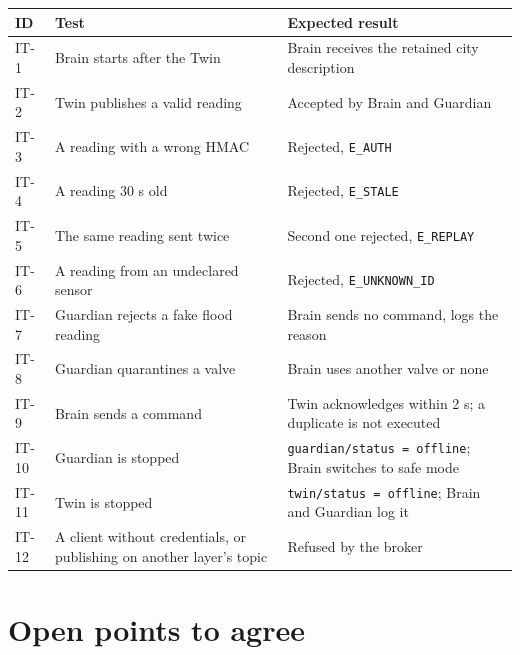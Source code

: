 \documentclass[11pt,a4paper]{article}
\newcommand{\code}[1]{\texttt{#1}}
\begin{document}
\begin{longtable}{@{}l p{8.4cm} p{4.6cm}@{}}
\toprule
\textbf{ID} & \textbf{Test} & \textbf{Expected result} \\
\midrule
\endhead
IT-1 & Brain starts after the Twin & Brain receives the retained city description \\
IT-2 & Twin publishes a valid reading & Accepted by Brain and Guardian \\
IT-3 & A reading with a wrong HMAC & Rejected, \code{E\_AUTH} \\
IT-4 & A reading 30 s old & Rejected, \code{E\_STALE} \\
IT-5 & The same reading sent twice & Second one rejected, \code{E\_REPLAY} \\
IT-6 & A reading from an undeclared sensor & Rejected, \code{E\_UNKNOWN\_ID} \\
IT-7 & Guardian rejects a fake flood reading & Brain sends no command, logs the reason \\
IT-8 & Guardian quarantines a valve & Brain uses another valve or none \\
IT-9 & Brain sends a command & Twin acknowledges within 2 s; a duplicate is not executed \\
IT-10 & Guardian is stopped & \code{guardian/\allowbreak status = offline}; Brain switches to safe mode \\
IT-11 & Twin is stopped & \code{twin/\allowbreak status = offline}; Brain and Guardian log it \\
IT-12 & A client without credentials, or publishing on another layer's topic & Refused by the broker \\
\bottomrule
\end{longtable}

\section{Open points to agree}
\end{document}
